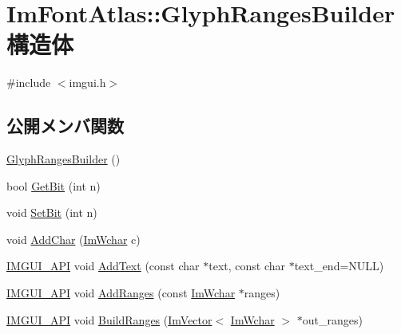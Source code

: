 \hypertarget{struct_im_font_atlas_1_1_glyph_ranges_builder}{}\section{Im\+Font\+Atlas\+:\+:Glyph\+Ranges\+Builder 構造体}
\label{struct_im_font_atlas_1_1_glyph_ranges_builder}


{\ttfamily \#include $<$imgui.\+h$>$}

\subsection*{公開メンバ関数}
\begin{DoxyCompactItemize}
\item 
\mbox{\hyperlink{struct_im_font_atlas_1_1_glyph_ranges_builder_a3c8d81e21a62329830d4c36ca4a1fbc3}{Glyph\+Ranges\+Builder}} ()
\item 
bool \mbox{\hyperlink{struct_im_font_atlas_1_1_glyph_ranges_builder_a157a4d95c361d717c073d5815d576eb5}{Get\+Bit}} (int n)
\item 
void \mbox{\hyperlink{struct_im_font_atlas_1_1_glyph_ranges_builder_aff570c016f17c1cd8d3a819b5f7a056c}{Set\+Bit}} (int n)
\item 
void \mbox{\hyperlink{struct_im_font_atlas_1_1_glyph_ranges_builder_a6b6b18e5c5fc4366afc98ff7391ba0bf}{Add\+Char}} (\mbox{\hyperlink{imgui_8h_af2c7badaf05a0008e15ef76d40875e97}{Im\+Wchar}} c)
\item 
\mbox{\hyperlink{imgui_8h_a43829975e84e45d1149597467a14bbf5}{I\+M\+G\+U\+I\+\_\+\+A\+PI}} void \mbox{\hyperlink{struct_im_font_atlas_1_1_glyph_ranges_builder_a6c0f9756dc8ea184920d5ff28bfdb669}{Add\+Text}} (const char $\ast$text, const char $\ast$text\+\_\+end=N\+U\+LL)
\item 
\mbox{\hyperlink{imgui_8h_a43829975e84e45d1149597467a14bbf5}{I\+M\+G\+U\+I\+\_\+\+A\+PI}} void \mbox{\hyperlink{struct_im_font_atlas_1_1_glyph_ranges_builder_a93174d62f8cf366528b654806ca7be49}{Add\+Ranges}} (const \mbox{\hyperlink{imgui_8h_af2c7badaf05a0008e15ef76d40875e97}{Im\+Wchar}} $\ast$ranges)
\item 
\mbox{\hyperlink{imgui_8h_a43829975e84e45d1149597467a14bbf5}{I\+M\+G\+U\+I\+\_\+\+A\+PI}} void \mbox{\hyperlink{struct_im_font_atlas_1_1_glyph_ranges_builder_aa55b5710971adef2e4c690a3e46de6d5}{Build\+Ranges}} (\mbox{\hyperlink{class_im_vector}{Im\+Vector}}$<$ \mbox{\hyperlink{imgui_8h_af2c7badaf05a0008e15ef76d40875e97}{Im\+Wchar}} $>$ $\ast$out\+\_\+ranges)
\end{DoxyCompactItemize}
